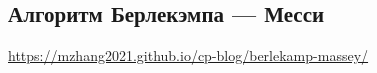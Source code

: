 \subsection{Алгоритм Берлекэмпа --- Месси}
\underline{\url{https://mzhang2021.github.io/cp-blog/berlekamp-massey/}}
